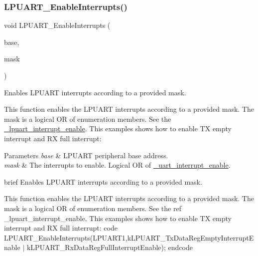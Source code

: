 \subsubsection{\texorpdfstring{LPUART\_EnableInterrupts()}{LPUART\_EnableInterrupts()}}
{\footnotesize\ttfamily void L\+P\+U\+A\+R\+T\+\_\+\+Enable\+Interrupts (\begin{DoxyParamCaption}\item[{\mbox{\hyperlink{struct_l_p_u_a_r_t___type}{L\+P\+U\+A\+R\+T\+\_\+\+Type}} $\ast$}]{base,  }\item[{uint32\+\_\+t}]{mask }\end{DoxyParamCaption})}



Enables L\+P\+U\+A\+RT interrupts according to a provided mask. 

This function enables the L\+P\+U\+A\+RT interrupts according to a provided mask. The mask is a logical OR of enumeration members. See the \mbox{\hyperlink{group__lpuart__driver_ga199a157d391291a9d003bf23954f9603}{\+\_\+lpuart\+\_\+interrupt\+\_\+enable}}. This examples shows how to enable TX empty interrupt and RX full interrupt\+: 
\begin{DoxyCode}{0}
\end{DoxyCode}



\begin{DoxyParams}{Parameters}
{\em base} & L\+P\+U\+A\+RT peripheral base address. \\
\hline
{\em mask} & The interrupts to enable. Logical OR of \mbox{\hyperlink{group__uart__driver_ga700f3cd8e3800273a1591307cab6311c}{\+\_\+uart\+\_\+interrupt\+\_\+enable}}.\\
\hline
\end{DoxyParams}
brief Enables L\+P\+U\+A\+RT interrupts according to a provided mask.

This function enables the L\+P\+U\+A\+RT interrupts according to a provided mask. The mask is a logical OR of enumeration members. See the ref \+\_\+lpuart\+\_\+interrupt\+\_\+enable. This examples shows how to enable TX empty interrupt and RX full interrupt\+: code L\+P\+U\+A\+R\+T\+\_\+\+Enable\+Interrupts(L\+P\+U\+A\+R\+T1,k\+L\+P\+U\+A\+R\+T\+\_\+\+Tx\+Data\+Reg\+Empty\+Interrupt\+Enable $\vert$ k\+L\+P\+U\+A\+R\+T\+\_\+\+Rx\+Data\+Reg\+Full\+Interrupt\+Enable); endcode

